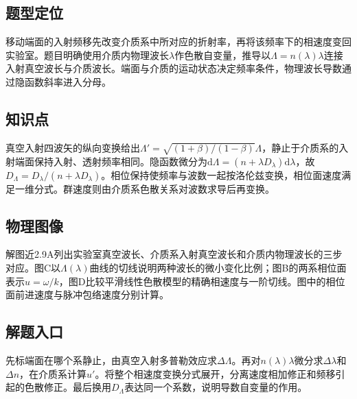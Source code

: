 \documentclass[UTF8,fontset=fandol,a4paper,11pt]{ctexart}
\begin{document}


\subsection*{题型定位}

移动端面的入射频移先改变介质系中所对应的折射率，再将该频率下的相速度变回实验室。题目明确使用介质内物理波长$\lambda$作色散自变量，推导以$\Lambda=n(\lambda)\lambda$连接入射真空波长与介质波长。端面与介质的运动状态决定频率条件，物理波长导数通过隐函数斜率进入分母。



\subsection*{知识点}

真空入射四波矢的纵向变换给出$\Lambda'=\sqrt{(1+\beta)/(1-\beta)}\Lambda$，静止于介质系的入射端面保持入射、透射频率相同。隐函数微分为$\mathrm d\Lambda=(n+\lambda D_\lambda)\mathrm d\lambda$，故$D_\Lambda=D_\lambda/(n+\lambda D_\lambda)$。相位保持使频率与波数一起按洛伦兹变换，相位面速度满足一维分式。群速度则由介质系色散关系对波数求导后再变换。



\subsection*{物理图像}

解图近2.9A列出实验室真空波长、介质系入射真空波长和介质内物理波长的三步对应。图C以$\Lambda(\lambda)$曲线的切线说明两种波长的微小变化比例；图B的两系相位面表示$u=\omega/k$，图D比较平滑线性色散模型的精确相速度与一阶切线。图中的相位面前进速度与脉冲包络速度分别计算。



\subsection*{解题入口}

先标端面在哪个系静止，由真空入射多普勒效应求$\Delta\Lambda$。再对$n(\lambda)\lambda$微分求$\Delta\lambda$和$\Delta n$，在介质系计算$u'$。将整个相速度变换分式展开，分离速度相加修正和频移引起的色散修正。最后换用$D_\Lambda$表达同一个系数，说明导数自变量的作用。
\end{document}
